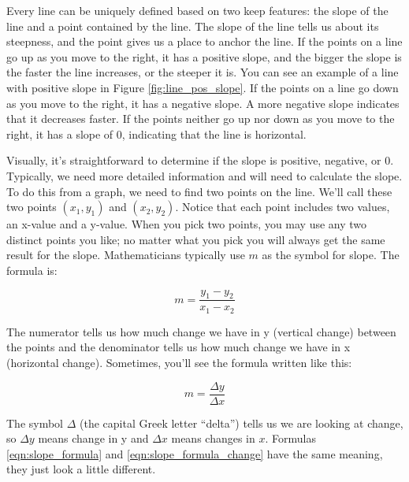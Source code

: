 



Every line can be uniquely defined based on two keep features: the slope of the line and a point contained by the line. The slope of the line tells us about its steepness, and the point gives us a  place to anchor the line. If the points on a line go up as you move to the right, it has a positive slope, and the bigger the slope is the faster the line increases, or the steeper it is. You can see an example of a line with positive slope in Figure \ref{fig:line_pos_slope}. If the points on a line go down as you move to the right, it has a negative slope. A more negative slope indicates that it decreases faster. If the points neither go up nor down as you move to the right, it has a slope of 0, indicating that the line is horizontal.

Visually, it's straightforward to determine if the slope is positive, negative, or 0. Typically, we need more detailed information and will need to calculate the slope. To do this from a graph, we need to find two points on the line. We'll call these two points $(x_1,y_1)$ and $(x_2,y_2)$. Notice that each point includes two values, an x-value and a y-value. When you pick two points, you may use any two distinct points you like; no matter what you pick you will always get the same result for the slope. Mathematicians typically use $m$ as the symbol for slope. The formula is:

\begin{equation}\label{eqn:slope_formula}
	m = \frac{y_1-y_2}{x_1-x_2}
\end{equation}


\noindent
The numerator tells us how much change we have in y (vertical change) between the points and the denominator tells us how much change we have in x (horizontal change). Sometimes, you'll see the formula written like this:

\begin{equation}\label{eqn:slope_formula_change}
	m = \frac{\Delta y}{\Delta x}
\end{equation}


\noindent
The symbol $\Delta$ (the capital Greek letter ``delta'') tells us we are looking at change, so $\Delta y$ means change in y and $\Delta x$ means changes in $x$. Formulas \ref{eqn:slope_formula} and \ref{eqn:slope_formula_change} have the same meaning, they just look a little different.

